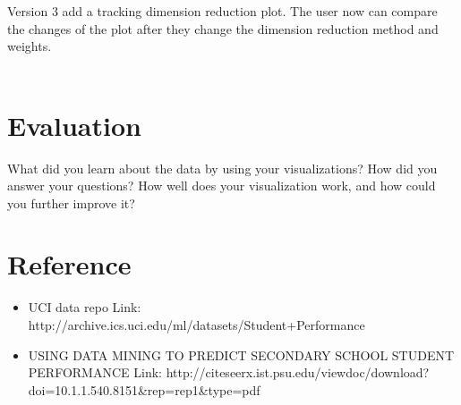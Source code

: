 \documentclass{article}
\begin{document}
Version 3 add a tracking dimension reduction plot. The user now can compare the changes of the plot after they change the dimension reduction method and weights.\\\


\section{Evaluation}
What did you learn about the data by using your visualizations? How did you answer your questions? How well does your visualization work, and how could you further improve it?




\section{Reference}
\begin{itemize}
\item UCI data repo Link: {http://archive.ics.uci.edu/ml/datasets/Student+Performance}
\item  USING DATA MINING TO PREDICT SECONDARY SCHOOL STUDENT PERFORMANCE Link: {http://citeseerx.ist.psu.edu/viewdoc/download?doi=10.1.1.540.8151\&rep=rep1\&type=pdf}
\end{itemize}
\end{document}
